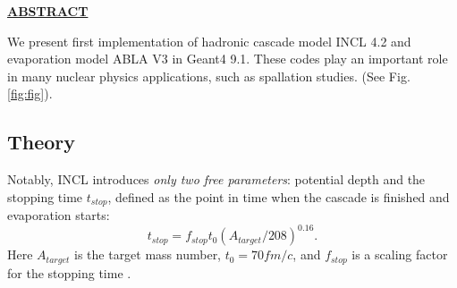 \documentclass[20pt]{article}
\newenvironment{textbox}
{\begin{lrbox}{\dummybox}\begin{minipage}{0.9\columnwidth}}
{\end{minipage}\end{lrbox}\raisebox{-\depth}{\psshadowbox[framesep=1em,framearc=.1,shadow=true]{\usebox{\dummybox}}}\vspace{0.005\textheight}}
\begin{document}
\begin{center}
\begin{multicols}{3}
\begin{textbox}
\begin{center}
\textbf{\Large\color{udsubsect}\underline{ABSTRACT}}
\end{center}

{\color{udsect}
We present first implementation of hadronic cascade model INCL 4.2
\cite{incl} and evaporation model ABLA V3 \cite{abla} in Geant4 9.1.
\vskip0.5cm
These codes play an important role in many nuclear physics
applications, such as spallation studies. (See Fig. \ref{fig:fig}).
%
%
%

}

\end{textbox}
\begin{textbox}

\section*{\color{udsect} Theory}

Notably, INCL introduces \emph{only two free parameters}: potential depth
and the stopping time
$t_{stop}$, defined as the point in time when the cascade is
finished and evaporation starts:
\begin{equation}
t_{stop} = f_{stop}t_0 (A_{target}/208) ^{0.16}.
\end{equation}
Here $A_{target}$ is the target mass number, $t_0 = 70 fm/c$, and
$f_{stop}$ is a scaling factor for the stopping time \cite{g4physref}.



\end{textbox}
\end{multicols}
\end{center}
\end{document}
